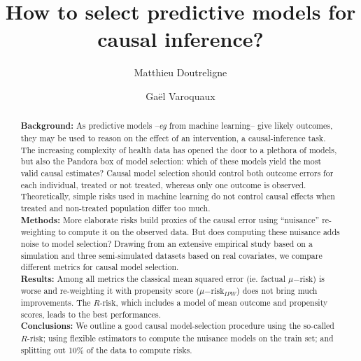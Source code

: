 \documentclass[10pt]{article}
\title{How to select predictive models for causal inference?}
\author[1,2,*]{Matthieu Doutreligne}
\author[1]{Gaël Varoquaux}
\affil[1]{Inria, Soda, Saclay, France}
\affil[2]{Mission Data, Haute Autorité de Santé, Saint-Denis, France}
\affil[*]{Corresponding author: matthieu.doutreligne@inria.fr}
\begin{document}


\maketitle

\begin{abstract}
    \textbf{Background:}
    As predictive models --\emph{eg} from machine learning-- give likely
    outcomes, they may be used to reason on the effect of an intervention,
    a causal-inference task. The increasing complexity of
    health data has opened the door to a plethora of models, but also the
    Pandora box of model selection: which of these models yield the most
    valid causal estimates? Causal model selection should control both outcome errors for each
    individual, treated or not treated, whereas only one outcome is observed.
    Theoretically, simple risks used in machine learning do not control causal
    effects when treated and non-treated population differ too much. \\
    \textbf{Methods:}
    More elaborate risks build proxies of the causal error using ``nuisance''
    re-weighting to compute it on the observed data. But does computing these
    nuisance adds noise to model selection? Drawing from an extensive empirical
    study based on a simulation and three semi-simulated datasets based on real
    covariates, we compare different metrics for causal model selection.\\
    \textbf{Results:} Among all metrics the classical mean squared error (ie.
    factual $\mu\mathrm{-risk}$) is worse and re-weighting it with propensity score
    ($\mu\mathrm{-risk}_{IPW}$) does not bring much improvements. The
    $R\text{-risk}$, which includes a model of mean outcome and propensity
    scores, leads to the best performances.\\
    \textbf{Conclusions:} We outline a good causal model-selection procedure
    using the so-called $R\text{-risk}$; using flexible estimators to compute
    the nuisance models on the train set; and splitting out 10\% of the data to
    compute risks.
\end{abstract}
\clearpage
\end{document}

